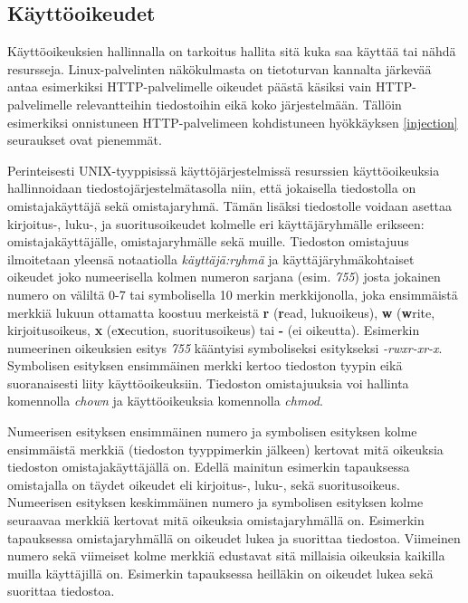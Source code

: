 \subsection{Käyttöoikeudet}\label{access_rights}
Käyttöoikeuksien hallinnalla on tarkoitus hallita sitä kuka saa käyttää tai nähdä resursseja. Linux-palvelinten näkökulmasta on tietoturvan kannalta järkevää antaa esimerkiksi HTTP-palvelimelle oikeudet päästä käsiksi vain HTTP-palvelimelle relevantteihin tiedostoihin eikä koko järjestelmään. Tällöin esimerkiksi onnistuneen HTTP-palvelimeen kohdistuneen hyökkäyksen \ref{injection} seuraukset ovat pienemmät.

Perinteisesti UNIX-tyyppisissä käyttöjärjestelmissä resurssien käyttöoikeuksia hallinnoidaan tiedostojärjestelmätasolla niin, että jokaisella tiedostolla on omistajakäyttäjä sekä omistajaryhmä. Tämän lisäksi tiedostolle voidaan asettaa kirjoitus-, luku-, ja suoritusoikeudet kolmelle eri käyttäjäryhmälle erikseen: omistajakäyttäjälle, omistajaryhmälle sekä muille. Tiedoston omistajuus ilmoitetaan yleensä notaatiolla \textit{käyttäjä:ryhmä} ja käyttäjäryhmäkohtaiset oikeudet joko numeerisella kolmen numeron sarjana (esim. \textit{755}) josta jokainen numero on väliltä 0-7 tai symbolisella 10 merkin merkkijonolla, joka ensimmäistä merkkiä lukuun ottamatta koostuu merkeistä \textbf{r} (\textbf{r}ead, lukuoikeus), \textbf{w} (\textbf{w}rite, kirjoitusoikeus, \textbf{x} (e\textbf{x}ecution, suoritusoikeus) tai \textbf{-} (ei oikeutta). Esimerkin numeerinen oikeuksien esitys \textit{755} kääntyisi symboliseksi esitykseksi \textit{-rwxr-xr-x}. Symbolisen esityksen ensimmäinen merkki kertoo tiedoston tyypin eikä suoranaisesti liity käyttöoikeuksiin. Tiedoston omistajuuksia voi hallinta komennolla \textit{chown} ja käyttöoikeuksia komennolla \textit{chmod}.

Numeerisen esityksen ensimmäinen numero ja symbolisen esityksen kolme ensimmäistä merkkiä (tiedoston tyyppimerkin jälkeen) kertovat mitä oikeuksia tiedoston omistajakäyttäjällä on. Edellä mainitun esimerkin tapauksessa omistajalla on täydet oikeudet eli kirjoitus-, luku-, sekä suoritusoikeus. Numeerisen esityksen keskimmäinen numero ja symbolisen esityksen kolme seuraavaa merkkiä kertovat mitä oikeuksia omistajaryhmällä on. Esimerkin tapauksessa omistajaryhmällä on oikeudet lukea ja suorittaa tiedostoa. Viimeinen numero sekä viimeiset kolme merkkiä edustavat sitä millaisia oikeuksia kaikilla muilla käyttäjillä on. Esimerkin tapauksessa heilläkin on oikeudet lukea sekä suorittaa tiedostoa.


